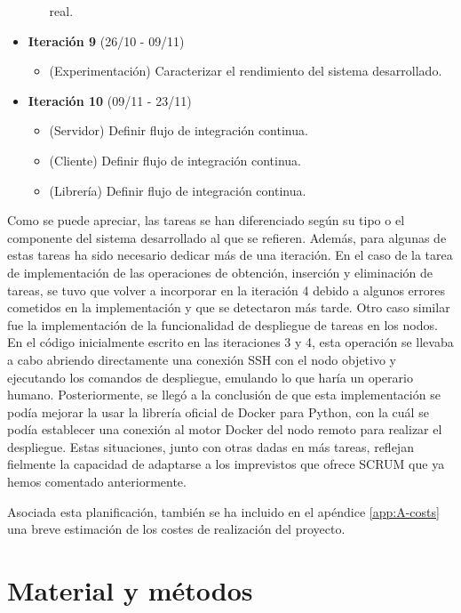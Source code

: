 \begin{itemize}
\begin{itemize}
                        real.
            \end{itemize}
      \item \textbf{Iteración 9} (26/10 - 09/11)
            \begin{itemize}
                  \item (Experimentación) Caracterizar el rendimiento del
                        sistema desarrollado.
            \end{itemize}
      \item \textbf{Iteración 10} (09/11 - 23/11)
            \begin{itemize}
                  \item (Servidor) Definir flujo de integración continua.
                  \item (Cliente) Definir flujo de integración continua.
                  \item (Librería) Definir flujo de integración continua.
            \end{itemize}
\end{itemize}

Como se puede apreciar, las tareas se han diferenciado según su tipo o el
componente del sistema desarrollado al que se refieren. Además, para algunas de
estas tareas ha sido necesario dedicar más de una iteración. En el caso de la
tarea de implementación de las operaciones de obtención, inserción y eliminación
de tareas, se tuvo que volver a incorporar en la iteración 4 debido a algunos
errores cometidos en la implementación y que se detectaron más tarde. Otro caso
similar fue la implementación de la funcionalidad de despliegue de tareas en los
nodos. En el código inicialmente escrito en las iteraciones 3 y 4, esta
operación se llevaba a cabo abriendo directamente una conexión SSH con el nodo
objetivo y ejecutando los comandos de despliegue, emulando lo que haría un
operario humano. Posteriormente, se llegó a la conclusión de que esta
implementación se podía mejorar la usar la librería oficial de Docker para
Python, con la cuál se podía establecer una conexión al motor Docker del nodo
remoto para realizar el despliegue. Estas situaciones, junto con otras dadas en
más tareas, reflejan fielmente la capacidad de adaptarse a los imprevistos que
ofrece SCRUM que ya hemos comentado anteriormente.

Asociada esta planificación, también se ha incluido en el apéndice
\ref{app:A-costs} una breve estimación de los costes de realización del
proyecto.

\section{Material y métodos}
\label{sec:01-tools}

